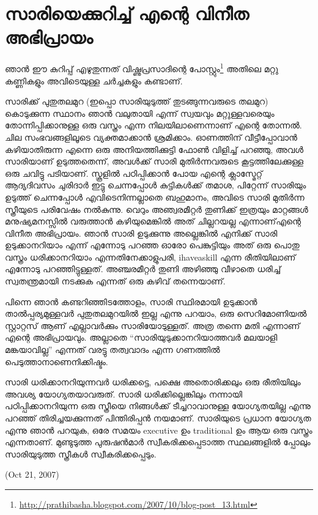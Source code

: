 \section*{സാരിയെക്കുറിച്ച് എന്റെ വിനീത അഭിപ്രായം}
\vskip 2pt


ഞാന്‍ ഈ കുറിപ്പ് എഴുതുന്നത് വിഷ്ണുപ്രസാദിന്റെ പോസ്റ്റും\footnote{\url{http://prathibasha.blogspot.com/2007/10/blog-post_13.html}} 
അതിലെ മറ്റു കണ്ണികളും അവിടെയുള്ള ചര്‍ച്ചകളും കണ്ടാണ്.

സാരിക്ക് പുതുതലമുറ (ഇപ്പൊ സാരിയുടുത്ത് തുടങ്ങുന്നവരുടെ തലമുറ) കൊടുക്കുന്ന സ്ഥാനം ഞാന്‍ വലുതായി 
എന്ന് സ്വയവും മറ്റുള്ളവരെയും തോന്നിപ്പിക്കാനുള്ള ഒരു വസ്ത്രം എന്ന നിലയിലാണെന്നാണ് എന്റെ തോന്നല്‍. 
ചില സംഭവങ്ങളിലൂടെ വ്യക്തമാക്കാന്‍ ശ്രമിക്കാം. ഓണത്തിന് വീട്ടീപ്പോവാന്‍ കഴിയാതിരുന്ന എന്നെ ഒരു 
അനിയത്തിക്കുട്ടി ഫോണ്‍ വിളിച്ച് പറഞ്ഞു, അവള്‍ സാരിയാണ് ഉടുത്തതെന്ന്, അവള്‍ക്ക് സാരി മുതിര്‍ന്നവരുടെ
കൂട്ടത്തിലേക്കുള്ള ഒരു ചവിട്ടു പടിയാണ്. സ്കൂളില്‍ പഠിപ്പിക്കാന്‍ പോയ എന്റെ ക്ലാസ്മേറ്റ് ആദ്യദിവസം ചുരിദാര്‍
ഇട്ടു ചെന്നപ്പോള്‍ കുട്ടികള്‍ക്ക് തമാശ, പിറ്റേന്ന് സാരിയും ഉടുത്ത് ചെന്നപ്പോള്‍ എവിടെനിന്നല്ലാതെ ബഹുമാനം, 
അവിടെ സാരി മുതിര്‍ന്ന സ്ത്രീയുടെ പരിവേഷം നല്‍കുന്നു. വെറും അഞ്വരമീറ്റര്‍ തുണിക്ക് ഇത്രയും മാറ്റങ്ങള്‍ 
മനുഷ്യമനസ്സില്‍ വരുത്താന്‍ കഴിയുമെങ്കില്‍ അത് ചില്ലറയല്ല എന്നാണ്എന്റെ വിനീത അഭിപ്രായം. ഞാന്‍ സാരി 
ഉടുക്കുന്നു അല്ലെങ്കില്‍ എനിക്ക് സാരി ഉടുക്കാനറിയാം എന്ന് എന്നോടു പറഞ്ഞ ഓരോ പെങ്കുട്ടിയും അത് ഒരു 
പൊതു വസ്ത്രം ധരിക്കാനറിയാം എന്നതിനേക്കാളുപരി, ihaveaskill എന്ന രീതിയിലാണ് എന്നോടു പറഞ്ഞിട്ടുള്ളത്. 
അഞ്ചരമീറ്റര്‍ തുണി അഴിഞ്ഞു വീഴാതെ ധരിച്ച് സ്വതന്ത്രമായി നടക്കുക എന്നത് ഒരു കഴിവ് തന്നെയാണ്.

പിന്നെ ഞാന്‍ കണ്ടറിഞ്ഞിടത്തോളം, സാരി സ്ഥിരമായി ഉടുക്കാന്‍ താല്‍പ്പര്യമുള്ളവര്‍ പുതുതലമുറയില്‍ ഇല്ല എന്നു പറയാം, 
ഒരു സെറിമോണിയല്‍ സ്റ്റാറ്റസ് ആണ് എല്ലാവര്‍ക്കും സാരിയോടുള്ളത്. അത്ര തന്നെ മതി എന്നാണ് എന്റെ അഭിപ്രായവും. 
അല്ലാതെ ``സാരിയുടുക്കാനറിയാത്തവര്‍ മലയാളി മങ്കയാവില്ല'' എന്നത് വരട്ടു തത്വവാദം എന്ന ഗണത്തില്‍ 
പെടുത്താനാണെനിക്കിഷ്ടം.

സാരി ധരിക്കാനറിയുന്നവര്‍ ധരിക്കട്ടെ, പക്ഷെ അതൊരിക്കലും ഒരു രീതിയിലും അവശ്യ യോഗ്യതയാവരുത്.
സാരി ധരിക്കില്ലെങ്കിലും നന്നായി പഠിപ്പിക്കാനറിയുന്ന ഒരു സ്ത്രീയെ നിങ്ങള്‍ക്ക് ടീച്ചറാവാനുള്ള യോഗ്യതയില്ല 
എന്നു പറഞ്ഞ് തിരിച്ചയക്കുന്നത് പിന്തിരിപ്പന്‍ നയമാണ്. സാരിയുടെ പ്രധാന യോഗ്യത എന്നു ഞാന്‍ പറയുക,
ഒരേ സമയം executive ഉം traditional ഉം ആയ ഒരു വസ്ത്രം എന്നതാണ്. മുണ്ടുടുത്ത പുരുഷന്‍മാര്‍ സ്വീകരിക്കപ്പെടാത്ത
സ്ഥലങ്ങളില്‍ പ്പോലും സാരിയുടുത്ത സ്ത്രീകള്‍ സ്വീകരിക്കപ്പെടും.

(Oct 21, 2007)
\newpage
